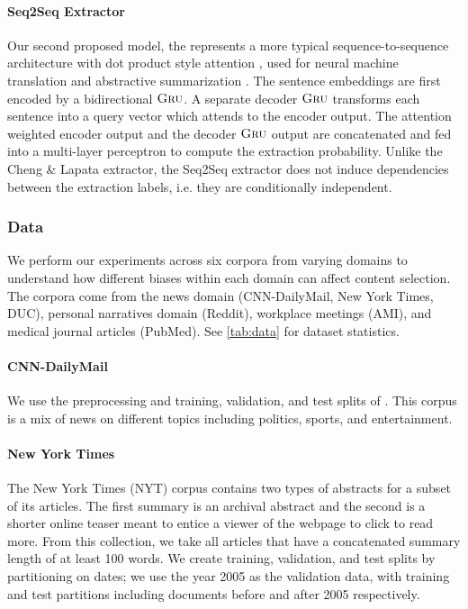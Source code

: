 \paragraph{Seq2Seq Extractor \citep{kedzie2018deep}} 
Our second proposed model, the represents a more typical sequence-to-sequence
architecture with dot product style attention \citep{luong2015effective},
used for neural machine translation \cite{bahdanau2014neural} and 
abstractive summarization \cite{see2017get}. 
The sentence embeddings are first
encoded by a bidirectional $\textsc{Gru}$. A separate decoder $\textsc{Gru}$ transforms each 
sentence into a query vector which attends to the encoder output. The
attention weighted encoder output and the decoder $\textsc{Gru}$ output are concatenated
and fed into a multi-layer perceptron to compute the extraction probability.
Unlike the Cheng \& Lapata extractor, the Seq2Seq extractor does not induce 
dependencies between the extraction labels, i.e. they are conditionally independent.

\subsubsection{Data}

We perform our experiments across six corpora from varying domains to 
understand how different biases within each domain can affect content 
selection. The corpora come from the news domain
(CNN-DailyMail, New York Times, DUC), personal narratives domain (Reddit),
workplace meetings (AMI), and medical journal articles (PubMed). See 
\autoref{tab:data} for dataset statistics.


\paragraph{CNN-DailyMail} We use the preprocessing and training, validation, 
and test splits
of \cite{see2017get}.
This corpus is a mix of news on different topics including politics,
sports, and entertainment.

\paragraph{New York Times}The New York Times (NYT) corpus \citep{sandhaus2008new} contains
 two types of abstracts for a subset of its articles. The first summary is
an archival abstract and the 
second is a shorter online teaser meant to entice a viewer of the webpage to
click to read more. From this collection, we take all articles that have 
a concatenated summary length of at least 100 words.
We create training, validation, and test splits by partitioning on dates;
we use the year 2005 as the validation data, with training and test partitions
including documents before and after 2005 respectively.

